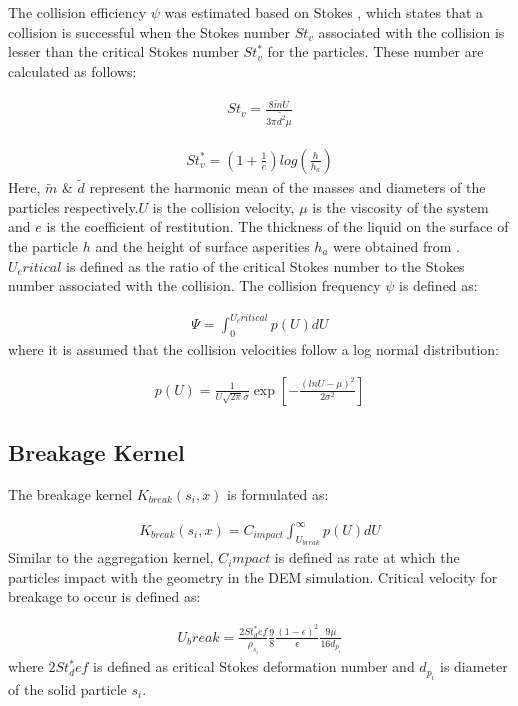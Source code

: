 \documentclass[preprint,10pt,authoryear,review]{elsarticle}
\begin{document}
The collision efficiency $\psi$ was estimated based on Stokes , which 
states that a collision is successful when the Stokes number $St_v$ associated 
with the collision is lesser than the critical Stokes number ${St^*_v}$ for the 
particles. These number are calculated as follows:

\begin{align}
St_v=\frac{8\tilde{m}U}{3\pi\tilde{d^2}\mu}
\label{eqn:mthds_pbm_agg_Stnum}
\end{align}

\begin{align}
St^*_v=\left(1+\frac{1}{e}\right)log\left(\frac{h}{h_a}\right)
\label{eqn:mthds_pbm_agg_cricSt}
\end{align}
Here, $\tilde{m}$ \& $\tilde{d}$ represent the harmonic mean of the masses and 
diameters of the particles respectively.$U$ is the collision velocity, $\mu$ is the 
viscosity of the system and $e$ is the coefficient of restitution. The thickness of 
the liquid on the surface of the particle $h$ and the height of surface asperities 
$h_a$ were obtained from \citep{Barrasso2015ces}. $U_critical$ is defined as the 
ratio of the critical Stokes number to the Stokes number associated with the collision. 
The collision frequency $\psi$ is defined as:

\begin{align}
\Psi = \int_0^{U_critical} p(U)dU
\label{eqn:mthds_pbm_agg_psi}
\end{align}
where it is assumed that the collision velocities follow a log normal distribution:


\begin{align}
p(U) = \frac{1}{U\sqrt{2\pi}\sigma}\exp\left[-\frac{(lnU-\mu)^2}{2\sigma^2}\right]
\label{eqn:mthds_pbm_agg_lognormVelo}
\end{align}



\subsection{Breakage Kernel}
\label{app:breakKernel}
The breakage kernel $K_{break}(s_i,x)$ is formulated as: 

\begin{align}
K_{break}(s_i,x) = C_{impact}\int_{U_{break}}^{\infty}p(U)dU
\label{eqn:mthds_pbm_breakage_kernel}
\end{align}
Similar to the aggregation kernel, $C_impact$ is defined as rate at which 
the particles impact with the geometry in the DEM simulation. Critical velocity 
for breakage to occur is defined as:

\begin{align}
U_break=\frac{2St^*_def}{\rho_{s_i}}\frac{9}{8}\frac{(1-\epsilon)^2}{\epsilon}\frac{9\mu}{16d_{p_i}}
\label{eqn:mthds_pbm_breakage_ubreak}
\end{align}
where $2St^*_def$ is defined as critical Stokes deformation number \citep{Iveson2001} and 
$d_{p_i}$ is diameter of the solid particle $s_i$.






\end{document}
